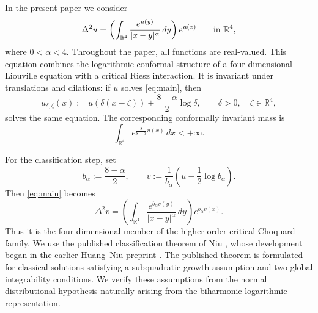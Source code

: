 \documentclass[11pt]{article}
\numberwithin{equation}{section}
\begin{document}
In the present paper we consider
\begin{equation}\label{eq:main}
\Delta^{2}u=
\left(\int_{\mathbb R^{4}}\frac{e^{u(y)}}{|x-y|^{\alpha}}\,dy\right)e^{u(x)}
\qquad\hbox{in }\mathbb R^{4},
\end{equation}
where \(0<\alpha<4\). Throughout the paper, all functions are real-valued. This equation combines the logarithmic conformal structure of a four-dimensional Liouville equation with a critical Riesz interaction. It is invariant under translations and dilations: if \(u\) solves \eqref{eq:main}, then
\begin{equation}\label{eq:invariance}
u_{\delta,\zeta}(x)
:=u(\delta(x-\zeta))+\frac{8-\alpha}{2}\log\delta,
\qquad \delta>0,\quad \zeta\in\mathbb R^{4},
\end{equation}
solves the same equation. The corresponding conformally invariant mass is
\begin{equation}\label{eq:finite-mass}
\int_{\mathbb R^{4}}e^{\frac{8}{8-\alpha}u(x)}\,dx<+\infty.
\end{equation}

For the classification step, set
\[
b_{\alpha}:=\frac{8-\alpha}{2},
\qquad
v:=\frac{1}{b_{\alpha}}
\left(u-\frac12\log b_{\alpha}\right).
\]
Then \eqref{eq:main} becomes
\[
\Delta^{2}v=
\left(\int_{\mathbb R^{4}}
\frac{e^{b_{\alpha}v(y)}}{|x-y|^{\alpha}}\,dy\right)
e^{b_{\alpha}v(x)}.
\]
Thus it is the four-dimensional member of the higher-order critical Choquard family. We use the published classification theorem of Niu \cite{NiuClassification}, whose development began in the earlier Huang--Niu preprint \cite{HuangNiu}. The published theorem is formulated for classical solutions satisfying a
subquadratic growth assumption and two global integrability conditions. We
verify these assumptions from the normal distributional hypothesis naturally
arising from the biharmonic logarithmic representation.
\end{document}
